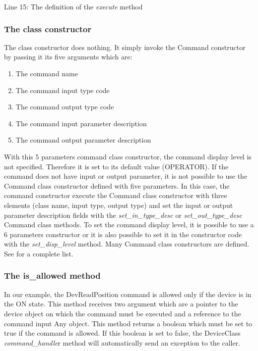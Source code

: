 Line 15: The definition of the \emph{execute} method

\subsubsection{The class constructor}

The class constructor does nothing. It simply invoke the Command
constructor by passing it its five arguments which are:
\begin{enumerate}
\item The command name
\item The command input type code
\item The command output type code
\item The command input parameter description
\item The command output parameter description
\end{enumerate}
With this 5 parameters command class constructor, the command display
level is not specified. Therefore it is set to its default value (OPERATOR).
If the command does not have input or output parameter, it is not
possible to use the Command class constructor defined with five parameters.
In this case, the command constructor execute the Command class constructor
with three elements (class name, input type, output type) and set
the input or output parameter description fields with the \emph{set\_in\_type\_desc}
or \emph{set\_out\_type\_desc} Command class
methods. To set the command display level, it is possible to use a
6 parameters constructor or it is also possible to set it in the constructor
code with the \emph{set\_disp\_level} method.
Many Command class constructors are defined. See \cite{TANGO_ref_man}for
a complete list.

\subsubsection{The is\_allowed method}

In our example, the DevReadPosition command is allowed only if the
device is in the ON state. This method receives two argument which
are a pointer to the device object on which the command must be executed
and a reference to the command input Any object. This method returns
a boolean which must be set to true if the command is allowed. If
this boolean is set to false, the DeviceClass
\emph{command\_handle}r method will automatically
send an exception to the caller.

